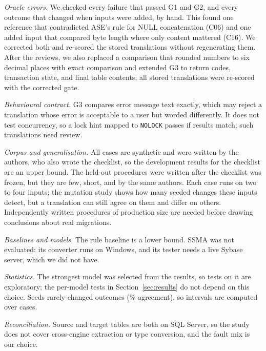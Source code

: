 \textit{Oracle errors.} We checked every failure that passed G1 and G2, and every outcome that changed when
inputs were added, by hand. This found one reference that contradicted ASE's rule for NULL concatenation
(C06) and one added input that compared byte length where only content mattered (C16). We corrected both
and re-scored the stored translations without regenerating them. After the reviews, we also replaced a
comparison that rounded numbers to six decimal places with exact comparison and extended G3 to return
codes, transaction state, and final table contents; all stored translations were re-scored with the
corrected gate.

\textit{Behavioural contract.} G3 compares error message text exactly, which may reject a translation whose
error is acceptable to a user but worded differently. It does not test concurrency, so a lock hint mapped to
\texttt{NOLOCK} passes if results match; such translations need review.

\textit{Corpus and generalisation.} All cases are synthetic and were written by the authors, who also wrote
the checklist, so the development results for the checklist are an upper bound. The held-out procedures
were written after the checklist was frozen, but they are few, short, and by the same authors. Each case
runs on two to four inputs; the mutation study shows how many seeded changes these inputs detect, but a
translation can still agree on them and differ on others. Independently written
procedures of production size are needed before drawing conclusions about real migrations.

\textit{Baselines and models.} The rule baseline is a lower bound. SSMA was not evaluated: its converter
runs on Windows, and its tester needs a live Sybase server, which we did not have.

\textit{Statistics.} The strongest model was selected from the results, so tests on it are exploratory; the
per-model tests in Section~\ref{sec:results} do not depend on this choice. Seeds rarely changed outcomes
(\RepAgreement\% agreement), so intervals are computed over cases.

\textit{Reconciliation.} Source and target tables are both on SQL Server, so the study does not cover
cross-engine extraction or type conversion, and the fault mix is our choice.
